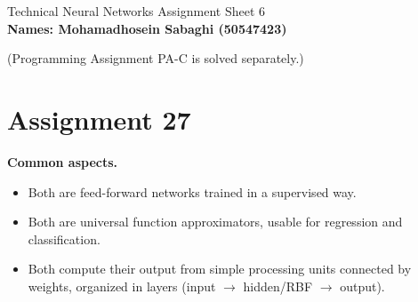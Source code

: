 \documentclass[11pt,a4paper]{article}
\begin{document}
\begin{center}
{\large Technical Neural Networks Assignment Sheet 6}\\[4pt]
{\bfseries Names: Mohamadhosein Sabaghi (50547423)}
\end{center}

{\small (Programming Assignment PA-C is solved separately.)}

\section*{Assignment 27}

\textbf{Common aspects.}
\begin{itemize}
  \item Both are feed-forward networks trained in a supervised way.
  \item Both are universal function approximators, usable for regression and classification.
  \item Both compute their output from simple processing units connected by weights, organized
  in layers (input $\to$ hidden/RBF $\to$ output).
\end{itemize}
\end{document}
